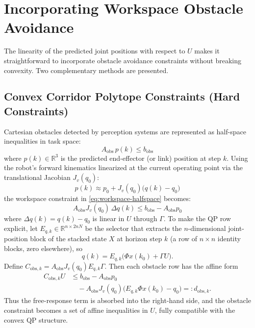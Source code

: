 \section{Incorporating Workspace Obstacle
Avoidance}\label{iv.-incorporating-workspace-obstacle-avoidance}

The linearity of the predicted joint positions with respect to \(U\)
makes it straightforward to incorporate obstacle avoidance constraints
without breaking convexity. Two complementary methods are presented.

\subsection{Convex Corridor Polytope Constraints (Hard
Constraints)}\label{a.-convex-corridor-polytope-constraints-hard-constraints}

Cartesian obstacles detected by perception systems are represented as
half-space inequalities in task space:
\begin{equation}
\label{eq:workspace-halfspace}
A_{\text{obs}} \, p(k) \leq b_{\text{obs}}
\end{equation}
where \(p(k) \in \mathbb{R}^3\) is the predicted end-effector (or link)
position at step \(k\). Using the robot's forward kinematics linearized
at the current operating point via the translational Jacobian
\(J_v(q_0)\):
\begin{equation}
\label{eq:fk-linearization}
p(k) \approx p_0 + J_v(q_0)\bigl(q(k) - q_0\bigr)
\end{equation}
the workspace constraint in \eqref{eq:workspace-halfspace} becomes:
\begin{equation}
\label{eq:workspace-linear-row}
A_{\text{obs}} J_v(q_0) \, \Delta q(k)
\leq b_{\text{obs}} - A_{\text{obs}} p_0
\end{equation}
where \(\Delta q(k) = q(k) - q_0\) is linear in \(U\) through
\(\Gamma\). To make the QP row explicit, let
\(E_{q,k}\in\mathbb{R}^{n\times 2nN}\) be the selector that extracts the
\(n\)-dimensional joint-position block of the stacked state \(X\) at
horizon step \(k\) (a row of \(n\times n\) identity blocks, zero
elsewhere), so
\begin{equation}
\label{eq:position-selector}
q(k)=E_{q,k}\bigl(\Phi x(k_0)+\Gamma U\bigr).
\end{equation}
Define \(C_{\text{obs},k}=A_{\text{obs}}J_v(q_0)E_{q,k}\Gamma\). Then
each obstacle row has the affine form
\begin{equation}
\label{eq:obstacle-row}
\begin{aligned}
 C_{\text{obs},k}U
&\le b_{\text{obs}}-A_{\text{obs}}p_0 \\
&\quad
-A_{\text{obs}}J_v(q_0)\bigl(E_{q,k}\Phi x(k_0)-q_0\bigr)
=: d_{\text{obs},k}.
\end{aligned}
\end{equation}
Thus the free-response term is absorbed into the right-hand side, and
the obstacle constraint becomes a set of affine inequalities in \(U\),
fully compatible with the convex QP structure.


